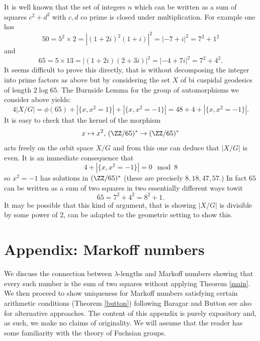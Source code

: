 It is well known that the set of integers $n$ 
which can be written as a sum of squares 
$c^2 + d^2$ with $c,d$ co prime is closed under multiplication.
For example one has
$$50 = 5^2 \times 2 = | (1+2i)^2 (1+i) |^2 = |  -7 + i |^2 = 7^2 + 1^2 $$
and
$$65 = 5 \times 13 = | (1+2i)(2+3 i) |^2 = |  -4 + 7i |^2 = 7^2 + 4^2.$$
It seems difficult to prove this directly, 
that is without decomposing the integer into prime factors as above 
but by considering  the set $X$ of bi cuspidal  geodesics of length $2\log 65$.
The Burnside Lemma for the group of automorphisms we consider above yields:
$$4 |X/G|   = \phi(65)+  |\{ x, x^2 = 1 \}| + |\{ x, x^2 = -1 \}| = 48 + 4 +  |\{ x, x^2 = -1 \}|.$$
It is easy to check that the 
kernel of the morphism 
$$x \mapsto x^2,\, (\ZZ/65)^* \rightarrow (\ZZ/65)^*$$
acts freely on the orbit space $X/G$
and from this one can deduce that $|X/G|$ is even.
It is an immediate consequence that 
$$ 4 +  |\{ x, x^2 = -1 \}| = 0 \mod 8 $$
so $x^2 = -1$ 
has solutions in $(\ZZ/65)^*$
(these are precisely  $8,18,47,57$.)
In fact $65$ can be written as a sum of two  squares 
in two essentially different ways towit
$$ 65 =  7^2 + 4^2 = 8^2 + 1.$$
It may be possible  that this kind of argument,
that is showing $|X/G|$ is divisible by some power of $2$,
can be adapted to the geometric setting to show this.



%
%
%


\section{Appendix: Markoff numbers}

We discuss the connection between $\lambda$-lengths
and Markoff numbers showing that every such number is 
the sum of two squares without applying Theorem \ref{main}.
We then proceed to show uniqueness for Markoff numbers
satisfying certain arithmetic conditions (Theorem \ref{button})
 following Baragar and Button
 see also \cite{mong,zhang,zhang2} for alternative approaches.
The content of this appendix is purely expository and,
as such,
we make no claims of originality.
We will assume that the reader has some familiarity with 
the theory of Fuchsian groups.


